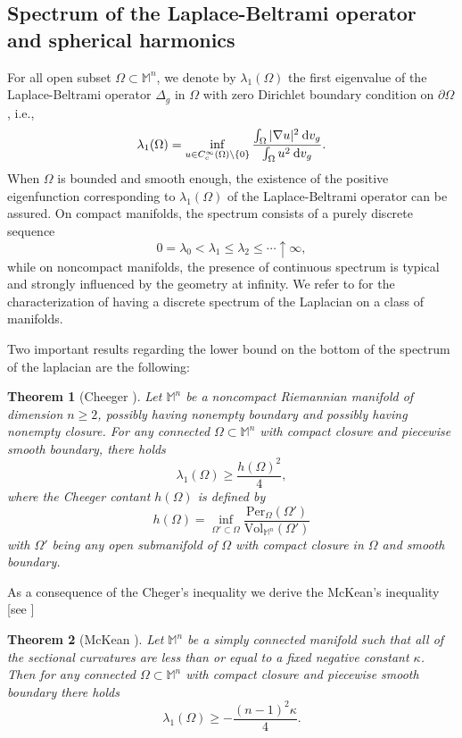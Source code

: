 \documentclass[a4paper,11pt,reqno]{amsart}
\theoremstyle{plain}
\newtheorem{theorem}{Theorem}[section]
\numberwithin{equation}{section} \allowdisplaybreaks
\newcommand{\dvg}{\: {\rm d}v_{g}}
\newcommand{\m}{\mathbb{M}^n}
\begin{document}
\subsection{Spectrum of the Laplace-Beltrami operator and spherical harmonics}
For all open subset $\Omega \subset \m$, we denote by $\lambda_1(\Omega)$ the first eigenvalue of the Laplace-Beltrami operator $\Delta_g$ in $\Omega$ with zero Dirichlet boundary condition on $\partial \Omega$, i.e.,
\begin{equation}\label{first eigenvalue Rayleigh quotient}
    \lambda_1(\Omega)=\inf_{u\in C_c^{\infty}(\Omega)\setminus \{0\}}\frac{\int_{\Omega}|\nabla u|^2\dvg}{\int_{\Omega}u^2\dvg}.
\end{equation}
When $\Omega$ is bounded and smooth enough, the existence of the positive eigenfunction corresponding to $\lambda_1(\Omega)$ of the Laplace-Beltrami operator can be assured. On compact manifolds, the spectrum consists of a purely discrete sequence
\begin{equation*}
    0=\lambda_0<\lambda_1\leq \lambda_2\leq \cdots\uparrow \infty,
\end{equation*}
while on noncompact manifolds, the presence of continuous spectrum is typical and strongly influenced by the geometry at infinity. We refer to \cite{CM} for the characterization of having a discrete spectrum of the Laplacian on a class of manifolds.

Two important results regarding the lower bound on the bottom of the spectrum of the laplacian are the following:
\begin{theorem}[Cheeger \cite{Cheeger}]
    Let $\m$ be a noncompact Riemannian manifold of dimension $n\geq 2$, possibly having nonempty boundary and possibly having nonempty closure. For any connected $\Omega\subset \m$ with compact closure and piecewise smooth boundary, there holds
    \begin{equation*}
        \lambda_1(\Omega) \geq \frac{h(\Omega)^2}{4},
    \end{equation*}
    where the Cheeger contant $h(\Omega)$ is defined by
    \begin{equation*}
        h(\Omega)=\inf_{\Omega '\subset \Omega}\frac{\text{Per}_{\Omega}(\Omega ')}{\text{Vol}_{\m}(\Omega ')}
    \end{equation*}
    with $\Omega '$ being any open submanifold of $\Omega$ with compact closure in $\Omega$ and smooth boundary.
\end{theorem}

As a consequence of the Cheger's inequality we derive the McKean's inequality [see \cite{Chavel}]
\begin{theorem}[McKean \cite{McKean}]
    Let $\m$ be a simply connected manifold such that all of the sectional curvatures are less than or equal to a fixed negative constant $\kappa$. Then for any connected $\Omega\subset \m$ with compact closure and piecewise smooth boundary there holds
    \begin{equation*}
        \lambda_1(\Omega)\geq -\frac{(n-1)^2 \kappa}{4}.
    \end{equation*}
\end{theorem}
\end{document}
